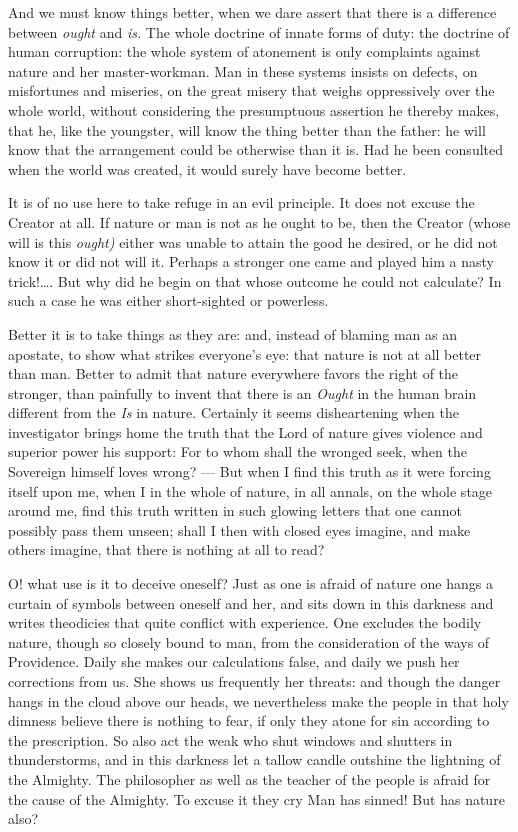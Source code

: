 \documentclass[12pt,a4paper,openany]{book}
\newcommand{\opage}[1]{\marginnote{\footnotesize\textit{[#1]}}}
\begin{document}
And we must know things better, when we dare assert that there is a difference
between \emph{ought} and \emph{is.} The whole doctrine of innate forms of duty:
the doctrine of human corruption: the whole system of atonement is only complaints
against nature and her master-workman. Man in these systems insists on defects, on
misfortunes and miseries, on the great misery that weighs oppressively over the
whole world, without considering the presumptuous assertion he thereby makes, that
he, like the youngster, will know the thing better than the father: he will know
that the arrangement could be otherwise than it is. Had he been consulted when the
world was created, it would surely have become better.

It is of no use here to take refuge in an evil principle. It does not excuse the
Creator at all. If nature or man is not as he ought to be, then the Creator (whose
will is this \emph{ought)} either was unable to attain the good he desired, or he
did not know it or did not will it. Perhaps a stronger one came and played him a
nasty trick!\dots{}. But why did he begin on that whose outcome he could not
calculate? In such a case he was either short-sighted or powerless.

Better it is to take things as they are: and, instead of blaming man as an
apostate, to show what strikes everyone's eye: that nature is not at all better
than man. Better to admit that nature everywhere favors the right of the stronger,
than painfully to invent that there is an \emph{Ought} in the human brain different
from the \emph{Is} in nature. Certainly it seems disheartening when the investigator
brings home the truth that the Lord of nature gives violence and superior power his
support: For to whom shall the wronged seek, when the Sovereign himself loves
wrong? --- But when I find
\setcounter{footnote}{0}%
\opage{42}this truth as it were forcing itself upon me, when I in the whole of nature,
in all annals, on the whole stage around me, find this truth written in such
glowing letters that one cannot possibly pass them unseen; shall I then with
closed eyes imagine, and make others imagine, that there is nothing at all to read?

O! what use is it to deceive oneself? Just as one is afraid of nature one hangs a
curtain of symbols between oneself and her, and sits down in this darkness and
writes theodicies that quite conflict with experience. One excludes the bodily
nature, though so closely bound to man, from the consideration of the ways of
Providence. Daily she makes our calculations false, and daily we push her
corrections from us. She shows us frequently her threats: and though the danger
hangs in the cloud above our heads, we nevertheless make the people in that holy
dimness believe there is nothing to fear, if only they atone for sin according to
the prescription. So also act the weak who shut windows and shutters in
thunderstorms, and in this darkness let a tallow candle outshine the lightning of
the Almighty. The philosopher as well as the teacher of the people is afraid for
the cause of the Almighty. To excuse it they cry Man has sinned! But has nature
also?
\end{document}
